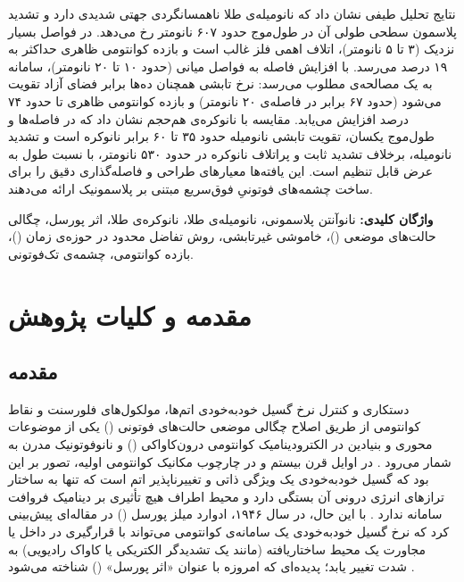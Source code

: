 \documentclass[12pt,a4paper]{report}
\begin{document}
نتایج تحلیل طیفی نشان داد که نانومیله‌ی طلا ناهمسانگردی جهتی شدیدی دارد و تشدید پلاسمون سطحی طولی آن در طول‌موج حدود ۶۰۷ نانومتر رخ می‌دهد. در فواصل بسیار نزدیک (۳ تا ۵ نانومتر)، اتلاف اهمی فلز غالب است و بازده کوانتومی ظاهری حداکثر به ۱۹ درصد می‌رسد. با افزایش فاصله به فواصل میانی (حدود ۱۰ تا ۲۰ نانومتر)، سامانه به یک مصالحه‌ی مطلوب می‌رسد: نرخ تابشی همچنان ده‌ها برابر فضای آزاد تقویت می‌شود (حدود ۶۷ برابر در فاصله‌ی ۲۰ نانومتر) و بازده کوانتومی ظاهری تا حدود ۷۴ درصد افزایش می‌یابد. مقایسه با نانوکره‌ی هم‌حجم نشان داد که در فاصله‌ها و طول‌موج یکسان، تقویت تابشی نانومیله حدود ۳۵ تا ۶۰ برابر نانوکره است و تشدید نانومیله، برخلاف تشدید ثابت و پراتلاف نانوکره در حدود ۵۳۰ نانومتر، با نسبت طول به عرض قابل تنظیم است. این یافته‌ها معیارهای طراحی و فاصله‌گذاری دقیق را برای ساخت چشمه‌های فوتونیِ فوق‌سریع مبتنی بر پلاسمونیک ارائه می‌دهند.

\vspace{6pt}
\noindent\textbf{واژگان کلیدی:} نانوآنتن پلاسمونی، نانومیله‌ی طلا، نانوکره‌ی طلا، اثر پورسل، چگالی حالت‌های موضعی ()، خاموشی غیرتابشی، روش تفاضل محدود در حوزه‌ی زمان ()، بازده کوانتومی، چشمه‌ی تک‌فوتونی.

\tableofcontents

\chapter{مقدمه و کلیات پژوهش}

\section{مقدمه}
دستکاری و کنترل نرخ گسیل خودبه‌خودی اتم‌ها، مولکول‌های فلورسنت و نقاط کوانتومی از طریق اصلاح چگالی موضعی حالت‌های فوتونی () یکی از موضوعات محوری و بنیادین در الکترودینامیک کوانتومی درون‌کاواکی () و نانوفوتونیک مدرن به شمار می‌رود \cite{novotny,maier}. در اوایل قرن بیستم و در چارچوب مکانیک کوانتومی اولیه، تصور بر این بود که گسیل خودبه‌خودی یک ویژگی ذاتی و تغییرناپذیر اتم است که تنها به ساختار ترازهای انرژی درونی آن بستگی دارد و محیط اطراف هیچ تأثیری بر دینامیک فروافت سامانه ندارد \cite{novotny}. با این حال، در سال ۱۹۴۶، ادوارد میلز پورسل () در مقاله‌ای پیش‌بینی کرد که نرخ گسیل خودبه‌خودی یک سامانه‌ی کوانتومی می‌تواند با قرارگیری در داخل یا مجاورت یک محیط ساختاریافته (مانند یک تشدیدگر الکتریکی یا کاواک رادیویی) به شدت تغییر یابد؛ پدیده‌ای که امروزه با عنوان «اثر پورسل» () شناخته می‌شود \cite{purcell,novotny}.
\end{document}

